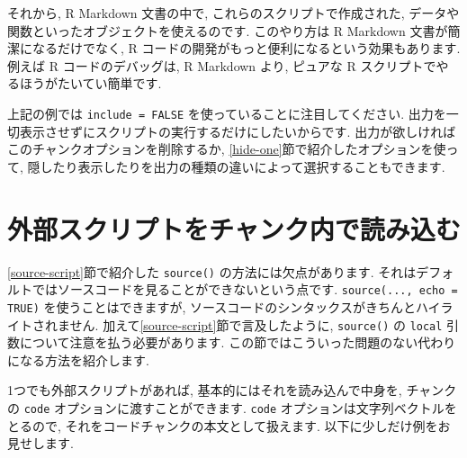 \documentclass[
  11pt,
  lualatex,ja=standard,jafont=noto]{bxjsreport}
\begin{document}
それから, R Markdown 文書の中で, これらのスクリプトで作成された, データや関数といったオブジェクトを使えるのです. このやり方は R Markdown 文書が簡潔になるだけでなく, R コードの開発がもっと便利になるという効果もあります. 例えば R コードのデバッグは, R Markdown より, ピュアな R スクリプトでやるほうがたいてい簡単です.

上記の例では \texttt{include = FALSE} を使っていることに注目してください. 出力を一切表示させずにスクリプトの実行するだけにしたいからです. 出力が欲しければこのチャンクオプションを削除するか, \ref{hide-one}節で紹介したオプションを使って, 隠したり表示したりを出力の種類の違いによって選択することもできます.

\hypertarget{option-code}{%
\section{外部スクリプトをチャンク内で読み込む}\label{option-code}}

\ref{source-script}節で紹介した \texttt{source()} の方法には欠点があります. それはデフォルトではソースコードを見ることができないという点です. \texttt{source(..., echo = TRUE)} を使うことはできますが, ソースコードのシンタックスがきちんとハイライトされません. 加えて\ref{source-script}節で言及したように, \texttt{source()} の \texttt{local} 引数について注意を払う必要があります. この節ではこういった問題のない代わりになる方法を紹介します.

1つでも外部スクリプトがあれば, 基本的にはそれを読み込んで中身を, チャンクの \texttt{code} オプションに渡すことができます. \texttt{code} オプションは文字列ベクトルをとるので, それをコードチャンクの本文として扱えます. 以下に少しだけ例をお見せします.
\end{document}
